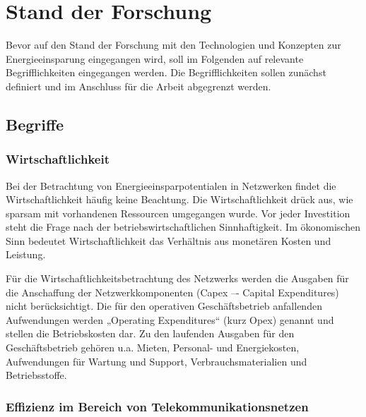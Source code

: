 \section{Stand der Forschung} \label{SdF}

Bevor auf den Stand der Forschung mit den Technologien und Konzepten zur Energieeinsparung eingegangen wird, soll im Folgenden auf relevante Begrifflichkeiten eingegangen werden. Die Begrifflichkeiten sollen zunächst definiert und im Anschluss für die Arbeit abgegrenzt werden.  

\subsection{Begriffe}

\subsubsection{Wirtschaftlichkeit}
  Bei der Betrachtung von Energieeinsparpotentialen in Netzwerken findet die Wirtschaftlichkeit häufig keine Beachtung. Die Wirtschaftlichkeit drück aus, wie sparsam mit vorhandenen Ressourcen umgegangen wurde.  Vor jeder Investition steht die Frage nach der betriebswirtschaftlichen Sinnhaftigkeit. Im ökonomischen Sinn bedeutet Wirtschaftlichkeit das Verhältnis aus monetären Kosten und Leistung. 


Für die Wirtschaftlichkeitsbetrachtung des Netzwerks werden die Ausgaben für die Anschaffung der Netzwerkkomponenten (Capex –- Capital Expenditures) nicht berück\-sichtigt. Die für den operativen Geschäftsbetrieb anfallenden Aufwendungen werden „Operating Expenditures“ (kurz Opex) genannt und stellen die Betriebskosten dar. Zu den laufenden Ausgaben für den Geschäfts\-betrieb gehören u.a. Mieten, Personal- und Energiekosten, Aufwendungen für Wartung und Support, Verbrauchsmaterialien und Betriebsstoffe. 

\subsubsection{Effizienz im Bereich von Telekommunikationsnetzen}




